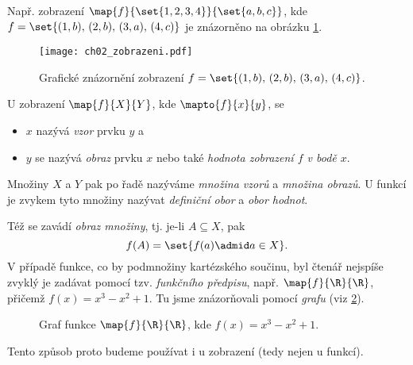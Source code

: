 Např. zobrazení $\map{f}{\set{1,2,3,4}}{\set{a,b,c}}$, kde $f=\set{(1,b),\,(2,b),\,(3,a),\,(4,c)}$ je znázorněno na obrázku \ref{fig:zobrazeni}.
\begin{figure}[H]
    \centering
    \texttt{[image: ch02\_zobrazeni.pdf]}
    \caption{Grafické znázornění zobrazení $f=\set{(1,b),\,(2,b),\,(3,a),\,(4,c)}$.}
    \label{fig:zobrazeni}
\end{figure}
U zobrazení $\map{f}{X}{Y}$, kde $\mapto{f}{x}{y}$, se
\begin{itemize}
    \item $x$ nazývá \emph{vzor} prvku $y$ a
    \item $y$ se nazývá \emph{obraz} prvku $x$ nebo také \emph{hodnota zobrazení $f$ v bodě $x$}.
\end{itemize}
Množiny $X$ a $Y$ pak po řadě nazýváme \emph{množina vzorů} a \emph{množina obrazů}. U funkcí je zvykem tyto množiny nazývat \emph{definiční obor} a \emph{obor hodnot}.\par
Též se zavádí \emph{obraz množiny}, tj. je-li $A\subseteq X$, pak
\begin{equation*}
    f(A)=\set{f(a) \admid a\in X}.
\end{equation*}
V případě funkce, co by podmnožiny kartézského součinu, byl čtenář nejspíše zvyklý je zadávat pomocí tzv. \emph{funkčního předpisu}, např. $\map{f}{\R}{\R}$, přičemž $f(x)=x^3-x^2+1$. Tu jsme znázorňovali pomocí \emph{grafu} (viz \ref{fig:funkce_graf}).
\begin{figure}[H]
    \centering
    
    \caption{Graf funkce $\map{f}{\R}{\R}$, kde $f(x)=x^3-x^2+1$.}
    \label{fig:funkce_graf}
\end{figure}
Tento způsob proto budeme používat i u zobrazení (tedy nejen u funkcí).

